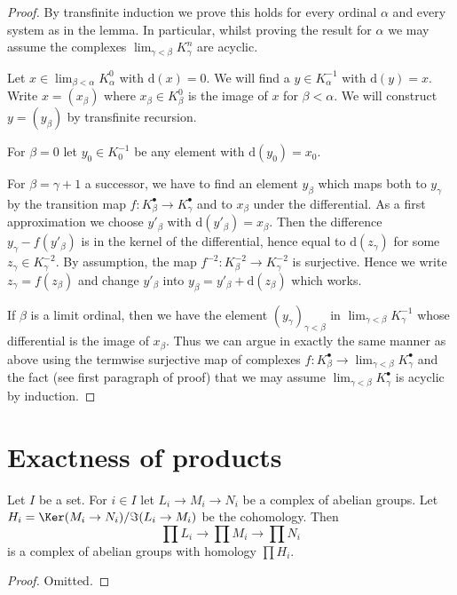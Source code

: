 \begin{proof}
By transfinite induction we prove this holds for every ordinal
$\alpha$ and every system as in the lemma. In particular, whilst
proving the result for $\alpha$ we may assume the complexes
$\lim_{\gamma < \beta} K^n_\gamma$ are acyclic.

\medskip\noindent
Let $x \in \lim_{\beta < \alpha} K^0_\alpha$ with $\text{d}(x) = 0$.
We will find a $y \in K^{-1}_\alpha$ with $\text{d}(y) = x$.
Write $x = (x_\beta)$ where $x_\beta \in K_\beta^0$ is the
image of $x$ for $\beta < \alpha$. We will construct $y = (y_\beta)$
by transfinite recursion.

\medskip\noindent
For $\beta = 0$ let $y_0 \in K_0^{-1}$
be any element with $\text{d}(y_0) = x_0$.

\medskip\noindent
For $\beta = \gamma + 1$ a successor, we have to find an element $y_\beta$
which maps both to $y_\gamma$ by the transition map
$f : K^\bullet_\beta \to K^\bullet_\gamma$ and to $x_\beta$ under the
differential. As a first approximation we choose $y'_\beta$ with
$\text{d}(y'_\beta) = x_\beta$. Then the difference $y_\gamma - f(y'_\beta)$
is in the kernel of the differential, hence equal to $\text{d}(z_\gamma)$
for some $z_\gamma \in K^{-2}_\gamma$.
By assumption, the map $f^{-2} : K^{-2}_\beta \to K^{-2}_\gamma$
is surjective. Hence we write $z_\gamma = f(z_\beta)$
and change $y'_\beta$ into $y_\beta = y'_\beta + \text{d}(z_\beta)$
which works.

\medskip\noindent
If $\beta$ is a limit ordinal, then we have the element
$(y_\gamma)_{\gamma < \beta}$ in $\lim_{\gamma < \beta} K^{-1}_\gamma$
whose differential is the image of $x_\beta$. Thus we can argue in exactly
the same manner as above using the termwise surjective map of complexes
$f : K_\beta^\bullet \to \lim_{\gamma < \beta} K_\gamma^\bullet$
and the fact (see first paragraph of proof) that we may assume
$\lim_{\gamma < \beta} K_\gamma^\bullet$ is acyclic by induction.
\end{proof}


\section{Exactness of products}
\label{section-product-exact}


\begin{lemma}
\label{lemma-product-abelian-groups-exact}
Let $I$ be a set. For $i \in I$ let $L_i \to M_i \to N_i$ be a complex
of abelian groups. Let $H_i = \Ker(M_i \to N_i)/\Im(L_i \to M_i)$
be the cohomology. Then
$$
\prod L_i \to \prod M_i \to \prod N_i
$$
is a complex of abelian groups with homology $\prod H_i$.
\end{lemma}

\begin{proof}
Omitted.
\end{proof}












